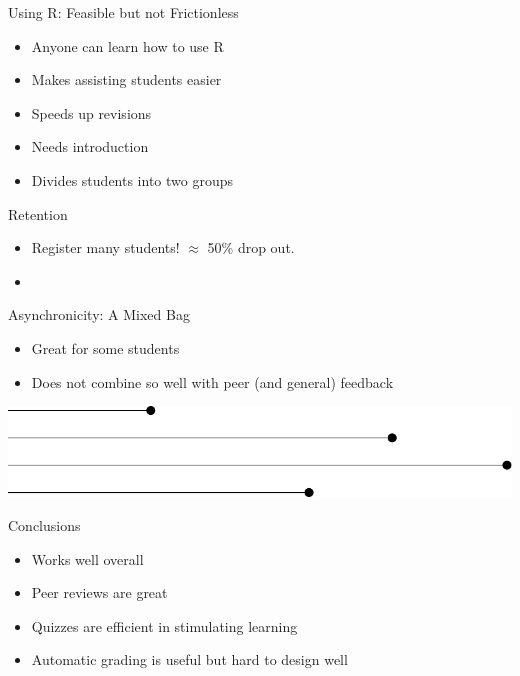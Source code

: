 \begin{frame}{Using R: Feasible but not Frictionless}
  \begin{itemize}
    \item Anyone can learn how to use R
    \item Makes assisting students easier
    \item Speeds up revisions
    \item Needs introduction
    \item Divides students into two groups
  \end{itemize}
\end{frame}

\begin{frame}{Retention}
  \begin{itemize}
    \item Register many students! \(\approx\) 50\% drop out.
    \item
  \end{itemize}
\end{frame}

\begin{frame}{Asynchronicity: A Mixed Bag}
  \begin{itemize}
    \item Great for some students
    \item Does not combine so well with peer (and general) feedback
  \end{itemize}
  \vspace{15ex}
  \begin{center}
    \includegraphics[width=0.7\linewidth]{figures/async.pdf}
  \end{center}
\end{frame}

\begin{frame}{Conclusions}
  \begin{itemize}
    \item Works well overall
    \item Peer reviews are great
    \item Quizzes are efficient in stimulating learning
    \item Automatic grading is useful but hard to design well
  \end{itemize}
\end{frame}



